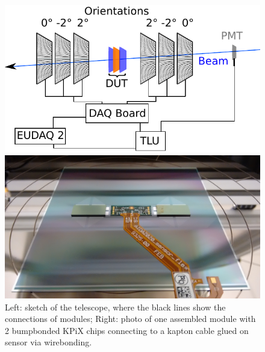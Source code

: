 \begin{figure}[!ht]%
\centering
\hspace{-100px}
\parbox{1.2in}{
\includegraphics[width=2.5\linewidth]{pics/principle.pdf}
}%
\hspace{150px}
\begin{minipage}{1.2in}%
\includegraphics[width=2.5\linewidth]{pics/sensor_module1.jpg}
\end{minipage}%
\caption{Left: sketch of the \lycoris telescope, where the black lines show the connections of modules;
Right: photo of one assembled module with 2 bumpbonded KPiX chips connecting to a kapton cable glued on sensor via wirebonding.}%
\label{fig:1figs}%
\end{figure}

